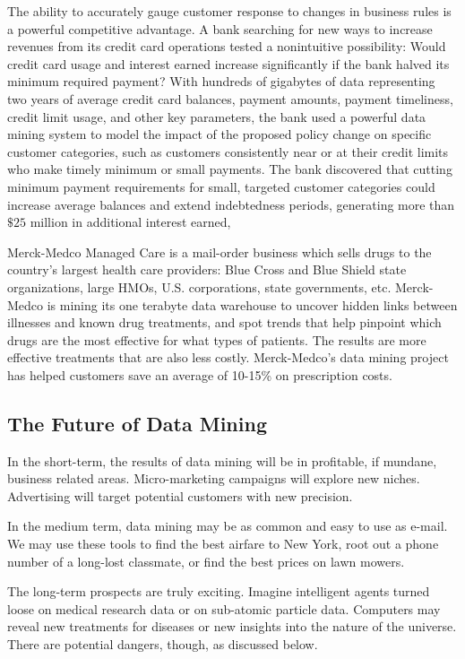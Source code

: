 \documentclass[12pt]{article}
\begin{document}
The ability to accurately gauge customer response to changes in business rules is a powerful competitive advantage. A bank searching for new ways to increase revenues from its credit card operations tested a nonintuitive possibility: Would credit card usage and interest earned increase significantly if the bank halved its minimum required payment? With hundreds of gigabytes of data representing two years of average credit card balances, payment amounts, payment timeliness, credit limit usage, and other key parameters, the bank used a powerful data mining system to model the impact of the proposed policy change on specific customer categories, such as customers consistently near or at their credit limits who make timely minimum or small payments. The bank discovered that cutting minimum payment requirements for small, targeted customer categories could increase average balances and extend indebtedness periods, generating more than $\$25$ million in additional interest earned,

Merck-Medco Managed Care is a mail-order business which sells drugs to the country's largest health care providers: Blue Cross and Blue Shield state organizations, large HMOs, U.S. corporations, state governments, etc. Merck-Medco is mining its one terabyte data warehouse to uncover hidden links between illnesses and known drug treatments, and spot trends that help pinpoint which drugs are the most effective for what types of patients. The results are more effective treatments that are also less costly. Merck-Medco's data mining project has helped customers save an average of 10-15\% on prescription costs.

\subsection{The Future of Data Mining}
In the short-term, the results of data mining will be in profitable, if mundane, business related areas. Micro-marketing campaigns will explore new niches. Advertising will target potential customers with new precision.

In the medium term, data mining may be as common and easy to use as e-mail. We may use these tools to find the best airfare to New York, root out a phone number of a long-lost classmate, or find the best prices on lawn mowers.

The long-term prospects are truly exciting. Imagine intelligent agents turned loose on medical research data or on sub-atomic particle data. Computers may reveal new treatments for diseases or new insights into the nature of the universe. There are potential dangers, though, as discussed below.
\end{document}
